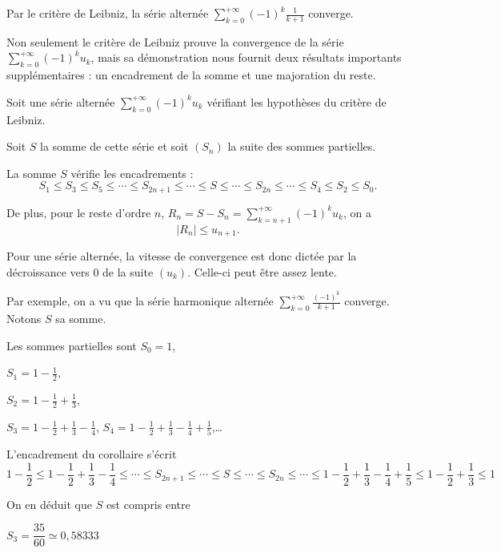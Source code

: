\change
Par le critère de Leibniz, la série alternée $\sum_{k=0}^{+\infty} (-1)^{k} \frac{1}{k+1}$ converge.

\diapo

Non seulement le critère de Leibniz prouve la convergence de la série 
$\sum_{k=0}^{+\infty} (-1)^k u_k$, mais sa démonstration nous fournit deux résultats importants supplémentaires : un encadrement de la somme et une majoration du reste.

Soit une série alternée $\displaystyle \sum_{k=0}^{+\infty} (-1)^k u_k$ vérifiant 
les hypothèses du critère de Leibniz.

\change
Soit $S$ la somme de cette série et soit $(S_n)$ la suite des sommes partielles.

\change
La somme $S$ vérifie les encadrements :
  $$ S_1\le S_3\le S_5\le \cdots \le S_{2n+1} \le \cdots \le S 
  \le  \cdots\le S_{2n} \le \cdots\le S_4\le S_2\le S_0.$$
  
\change
De plus, pour le reste d'ordre $n$, $\displaystyle R_n=S-S_n =\sum_{k=n+1}^{+\infty} (-1)^k u_k$, on  a
$$\big|R_n\big|\le u_{n+1}.$$  

\change
Pour une série alternée, la vitesse de convergence est donc
dictée par la décroissance vers $0$ de la suite $(u_k)$. Celle-ci
peut être assez lente.

\diapo

Par exemple, on a vu que la série harmonique alternée 
$\sum_{k=0}^{+\infty} \frac{(-1)^{k}}{k+1}$ converge. Notons $S$ sa somme.

\change
Les sommes partielles sont
$S_0 = 1$, 

\change
$S_1 = 1-\frac{1}{2}$,

\change
$S_2 = 1-\frac{1}{2}+\frac{1}{3}$,

\change
$S_3 = 1-\frac{1}{2}+\frac{1}{3}-\frac{1}{4}$,
$S_4 = 1-\frac{1}{2}+\frac{1}{3}-\frac{1}{4}+\frac{1}{5}$,\ldots

\change
L'encadrement du corollaire s'écrit 
$$1-\frac{1}{2} \le 1-\frac{1}{2}+\frac{1}{3}-\frac{1}{4} \le \cdots \le S_{2n+1} \le \cdots \le S 
  \le  \cdots\le S_{2n} \le \cdots 
  \le 1-\frac{1}{2}+\frac{1}{3}-\frac{1}{4}+\frac{1}{5}
  \le 1-\frac{1}{2}+\frac{1}{3} \le 1$$
  
\change
On en déduit que $S$ est compris entre 

$S_3 = \dfrac{35}{60} \simeq 0,58333$

